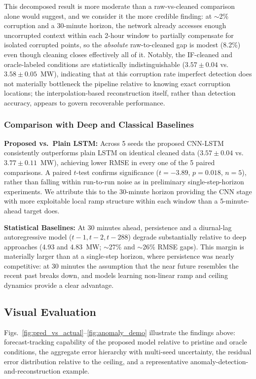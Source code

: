 \documentclass[conference]{IEEEtran}
\begin{document}
This decomposed result is more moderate than a raw-vs-cleaned comparison alone would suggest, and we consider it the more credible finding: at $\sim$2\% corruption and a 30-minute horizon, the network already accesses enough uncorrupted context within each 2-hour window to partially compensate for isolated corrupted points, so the \emph{absolute} raw-to-cleaned gap is modest (8.2\%) even though cleaning closes effectively all of it. Notably, the IF-cleaned and oracle-labeled conditions are statistically indistinguishable ($3.57 \pm 0.04$ vs.\ $3.58 \pm 0.05$~MW), indicating that at this corruption rate imperfect detection does not materially bottleneck the pipeline relative to knowing exact corruption locations; the interpolation-based reconstruction itself, rather than detection accuracy, appears to govern recoverable performance.

\subsubsection{Comparison with Deep and Classical Baselines}
\textbf{Proposed vs.\ Plain LSTM:} Across 5 seeds the proposed CNN-LSTM consistently outperforms plain LSTM on identical cleaned data ($3.57 \pm 0.04$ vs.\ $3.77 \pm 0.11$~MW), achieving lower RMSE in every one of the 5 paired comparisons. A paired $t$-test confirms significance ($t=-3.89$, $p=0.018$, $n=5$), rather than falling within run-to-run noise as in preliminary single-step-horizon experiments. We attribute this to the 30-minute horizon providing the CNN stage with more exploitable local ramp structure within each window than a 5-minute-ahead target does.

\textbf{Statistical Baselines:} At 30 minutes ahead, persistence and a diurnal-lag autoregressive model ($t{-}1, t{-}2, t{-}288$) degrade substantially relative to deep approaches (4.93 and 4.83~MW; $\sim$27\% and $\sim$26\% RMSE gaps). This margin is materially larger than at a single-step horizon, where persistence was nearly competitive: at 30 minutes the assumption that the near future resembles the recent past breaks down, and models learning non-linear ramp and ceiling dynamics provide a clear advantage.

\subsection{Visual Evaluation}
Figs.~\ref{fig:pred_vs_actual}--\ref{fig:anomaly_demo} illustrate the findings above: forecast-tracking capability of the proposed model relative to pristine and oracle conditions, the aggregate error hierarchy with multi-seed uncertainty, the residual error distribution relative to the ceiling, and a representative anomaly-detection-and-reconstruction example.
\end{document}
